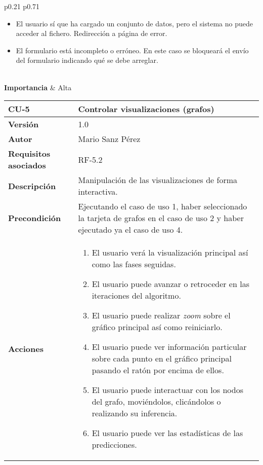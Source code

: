 \begin{table}[p]
\begin{tabularx}{\linewidth}{ p{0.21\columnwidth} p{0.71\columnwidth} }
\begin{itemize}
			\item El usuario sí que ha cargado un conjunto de datos, pero el sistema no puede acceder al fichero. Redirección a página de error.
			\item El formulario está incompleto o erróneo. En este caso se bloqueará el envío del formulario indicando qué se debe arreglar.
		\end{itemize} \\
		\textbf{Importancia}          & Alta \\
		\bottomrule
	\end{tabularx}
	\caption{Caso de uso 4: Configurar algoritmo.}
\end{table}

\begin{table}[p]
	\centering
	\begin{tabularx}{\linewidth}{ p{} p{} }
		\toprule
		\textbf{CU-5}    & \textbf{Controlar visualizaciones (grafos)}\\
		\toprule
		\textbf{Versión}              & 1.0    \\
		\textbf{Autor}                & Mario Sanz Pérez \\
		\textbf{Requisitos asociados} & RF-5.2 \\
		\textbf{Descripción}          & Manipulación de las visualizaciones de forma interactiva. \\
		\textbf{Precondición}         & Ejecutando el caso de uso 1, haber seleccionado la tarjeta de grafos en el caso de uso 2 y haber ejecutado ya el caso de uso 4. \\
		\textbf{Acciones}             &
		\begin{enumerate}
			\def\labelenumi{\arabic{enumi}.}
			\tightlist
			\item El usuario verá la visualización principal así como las fases seguidas.
			\item El usuario puede avanzar o retroceder en las iteraciones del algoritmo.
			\item El usuario puede realizar \textit{zoom} sobre el gráfico principal así como reiniciarlo.
			\item El usuario puede ver información particular sobre cada punto en el gráfico principal pasando el ratón por encima de ellos.
			\item El usuario puede interactuar con los nodos del grafo, moviéndolos, clicándolos o realizando su inferencia.
			\item El usuario puede ver las estadísticas de las predicciones.

\end{enumerate}
\end{tabularx}
\end{table}
